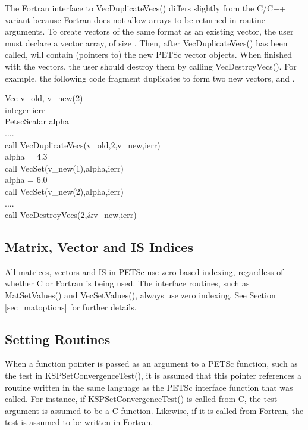 The Fortran interface to VecDuplicateVecs() differs slightly
from the C/C++ variant because Fortran does not allow arrays to be
returned in routine arguments.  To create  vectors of the same
format as an existing vector, the user must declare a vector array,
 of size .  Then, after VecDuplicateVecs() has
been called,  will contain (pointers to) the new PETSc
vector objects.  When finished with the vectors, the user should
destroy them by calling VecDestroyVecs().
For example, the following code fragment
duplicates  to form two new vectors,  and .
\begin{tabbing}
   Vec     v\_old, v\_new(2)\\
   integer ierr\\
   PetscScalar  alpha\\
   ....\\
   call VecDuplicateVecs(v\_old,2,v\_new,ierr)\\
   alpha = 4.3\\
   call VecSet(v\_new(1),alpha,ierr)\\
   alpha = 6.0\\
   call VecSet(v\_new(2),alpha,ierr)\\
   ....\\
   call VecDestroyVecs(2,\&v\_new,ierr)
\end{tabbing}

\subsection{Matrix, Vector and IS Indices}

All matrices, vectors and IS in PETSc use zero-based indexing, regardless
of whether C or Fortran is being used.  The interface routines, such
as MatSetValues() and VecSetValues(), always use zero
indexing.  See Section \ref{sec_matoptions} for further details.

\subsection{Setting Routines}

When a function pointer is passed as an argument to a PETSc function, such as
the test in KSPSetConvergenceTest(), it is assumed that this pointer references
a routine written in the same language as the PETSc interface function that was
called. For instance, if KSPSetConvergenceTest() is called from C, the test
argument is assumed to be a C function. Likewise, if it is called from Fortran,
the test is assumed to be written in Fortran.

